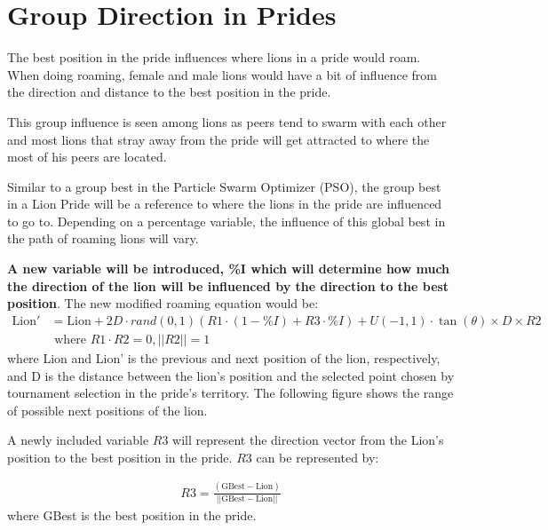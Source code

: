 \section{Group Direction in Prides}
\par The best position in the pride influences where lions in a pride would roam. When doing roaming, female and male lions would have a bit of influence from the direction and distance to the best position in the pride.

\par This group influence is seen among lions as peers tend to swarm with each other and most lions that stray away from the pride will get attracted to where the most of his peers are located. \cite{strategy}

\par Similar to a group best in the Particle Swarm Optimizer (PSO), the group best in a Lion Pride will be a reference to where the lions in the pride are influenced to go to. \cite{pso} Depending on a percentage variable, the influence of this global best in the path of roaming lions will vary.

\par \textbf{A new variable will be introduced, \%I which will determine how much the direction of the lion will be influenced by the direction to the best position}. The new modified roaming equation would be:
\begin{align*}
\text{Lion}' &= \text{Lion} + 2D \cdot rand(0,1) ({R1}\cdot(1-\%I) + R3\cdot\%I) + U(-1,1) \cdot \tan(\theta) \times D \times {R2} \\
&\text{  where } R1 \cdot R2 = 0, ||R2|| = 1
\end{align*}
where Lion and Lion' is the previous and next position of the  lion, respectively, and D is the distance between the  lion's position and the selected point chosen by tournament selection in the pride's territory. The following figure shows the range of possible next positions of the lion.

\par A newly included variable $R3$ will represent the direction vector from the Lion's position to the best position in the pride. $R3$ can be represented by:

\begin{align*}
  R3 = \frac{(\text{GBest} - \text{Lion})}{||\text{GBest} - \text{Lion}||}
\end{align*}
where GBest is the best position in the pride.
